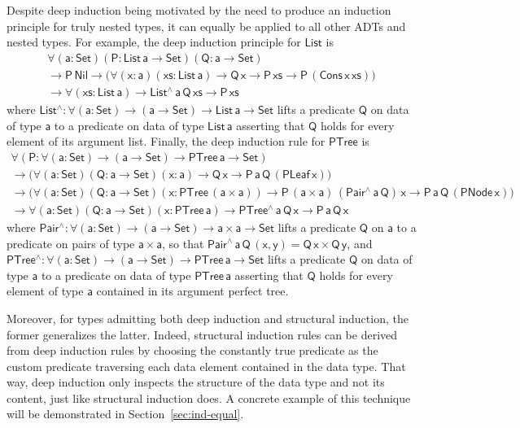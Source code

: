 \documentclass[acmsmall,screen,review,anonymous]{acmart}
\theoremstyle{definition}
\begin{document}
Despite deep induction being motivated by the need to produce an induction principle for truly nested types,
it can equally be applied to all other ADTs and nested types.
For example, the deep induction principle for $\mathsf{List}$ is
\begin{multline*}
\mathsf{\forall (a : Set) (P : List\, a \to Set) (Q : a \to Set)} \\
\mathsf{\to P\,Nil \to \big( \forall (x : a) (xs: List\,a) \to Q\,x \to P\,xs \to P\,(Cons\,x\,xs)\big)} \\
\mathsf{\to \forall (xs : List\,a) \to List^{\wedge}\,a\,Q\,xs \to P\, xs }
\end{multline*}
where $\mathsf{List^{\wedge} : \forall (a : Set) \to (a \to Set) \to List\,a \to Set}$ lifts a predicate $\mathsf{Q}$ on data of type $\mathsf{a}$ to a predicate on data of type $\mathsf{List\,a}$ asserting that $\mathsf{Q}$ holds for every element of its argument list.
Finally, the deep induction rule for $\mathsf{PTree}$ is
\begin{multline*}
\mathsf{\forall (P : \forall (a : Set) \to (a \to Set) \to PTree\, a \to Set)} \\
\mathsf{\to \big( \forall (a : Set) (Q : a \to Set) (x : a) \to Q\,x \to P\,a\,Q\,(PLeaf\, x) \big)} \\
\mathsf{\to \big( \forall (a : Set) (Q : a \to Set) (x : PTree\,(a \times a)) \to P\,(a \times a)\,(Pair^{\wedge}\,a\,Q)\,x \to P\,a\,Q\,(PNode\,x)\big)} \\
\mathsf{\to \forall (a : Set) (Q : a \to Set) (x : PTree\,a) \to PTree^{\wedge}\,a\,Q\,x \to P\,a\,Q\,x }
\end{multline*}
where $\mathsf{Pair^{\wedge} : \forall (a : Set) \to (a \to Set) \to a \times a \to Set}$ lifts a predicate $\mathsf{Q}$ on $\mathsf{a}$ to a predicate on pairs of type $\mathsf{a \times a}$,
so that $\mathsf{Pair^{\wedge}\,a\,Q\,(x,y) = Q\,x \times Q\,y}$,
and $\mathsf{PTree^{\wedge} : \forall (a : Set) \to (a \to Set) \to PTree\,a \to Set}$ lifts a predicate $\mathsf{Q}$ on data of type $\mathsf{a}$ to a predicate on data of type $\mathsf{PTree\,a}$ asserting that $\mathsf{Q}$ holds for every element of type $\mathsf{a}$ contained in its argument perfect tree.

{\color{blue} Moreover, for types admitting both deep induction and structural induction, the former generalizes the latter.
Indeed, structural induction rules can be derived from deep induction rules by choosing the constantly true predicate as the custom predicate traversing each data element contained in the data type.
That way, deep induction only inspects the structure of the data type and not its content, just like structural induction does.
A concrete example of this technique will be demonstrated in Section~\ref{sec:ind-equal}.}
\end{document}
